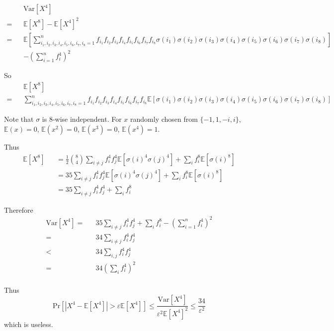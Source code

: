 
			\begin{eqnarray*}
				&&\text{Var}[X^4] \\
				= &&\mathbb{E}[X^8] - \mathbb{E}[X^4]^2 \\
				= &&\mathbb{E}[\sum_{i_1, i_2, i_3, i_4, i_5, i_6, i_7, i_8 = 1}^n f_{i_1} f_{i_2} f_{i_3} f_{i_4} f_{i_5} f_{i_6} f_{i_7} f_{i_8} \sigma(i_1) \sigma(i_2) \sigma(i_3) \sigma(i_4) \sigma(i_5) \sigma(i_6) \sigma(i_7) \sigma(i_8)]\\
				&&- (\sum_{i = 1}^n f_i^4)^2
			\end{eqnarray*}
			
			So
			\begin{eqnarray*}
				&&\mathbb{E}[X^8] \\
				= && \sum_{i_1, i_2, i_3, i_4, i_5, i_6, i_7, i_8 = 1}^n f_{i_1} f_{i_2} f_{i_3} f_{i_4} f_{i_5} f_{i_6} f_{i_7} f_{i_8} \mathbb{E}[\sigma(i_1) \sigma(i_2) \sigma(i_3) \sigma(i_4) \sigma(i_5) \sigma(i_6) \sigma(i_7) \sigma(i_8)]
			\end{eqnarray*}
			
			Note that $\sigma$ is 8-wise independent.
			For $x$ randomly chosen from $\{-1, 1, -i, i\}$, $\mathbb{E}(x) = 0$, $\mathbb{E}(x^2) = 0$, $\mathbb{E}(x^3) = 0$, $\mathbb{E}(x^4) = 1$.
			
			Thus
			\begin{eqnarray*}
				\mathbb{E}[X^8] &&= \frac{1}{2} \binom{8}{4} \sum_{i \neq j} f_{i}^4 f_{j}^4 \mathbb{E}[\sigma(i)^4 \sigma(j)^4]+ \sum_{i} f_{i}^8 \mathbb{E}[\sigma(i)^8] \\
				&&= 35 \sum_{i \neq j} f_{i}^4 f_{j}^4 \mathbb{E}[\sigma(i)^4 \sigma(j)^4] + \sum_{i} f_{i}^8 \mathbb{E}[\sigma(i)^8] \\
				&&= 35 \sum_{i \neq j} f_{i}^4 f_{j}^4 + \sum_{i} f_{i}^8
			\end{eqnarray*}
			
			Therefore
			\begin{eqnarray*}
				\text{Var}[X^4]
				= &&35 \sum_{i \neq j} f_{i}^4 f_{j}^4 + \sum_{i} f_{i}^8 - (\sum_{i = 1}^n f_i^4)^2 \\
				= &&34 \sum_{i \neq j} f_{i}^4 f_{j}^4 \\
				< &&34 \sum_{i, j} f_{i}^4 f_{j}^4 \\
				= &&34 (\sum_{i} f_{i}^4)^2 \\
			\end{eqnarray*}
			
			Thus
			\[
				\text{Pr}[|X^4 - \mathbb{E}[X^4]| > \varepsilon \mathbb{E}[X^4]] \leq \frac{\text{Var}[X^4]}{\varepsilon^2 \mathbb{E}[X^4]^2} \leq \frac{34}{\varepsilon^2}
			\]
			which is useless.
			
